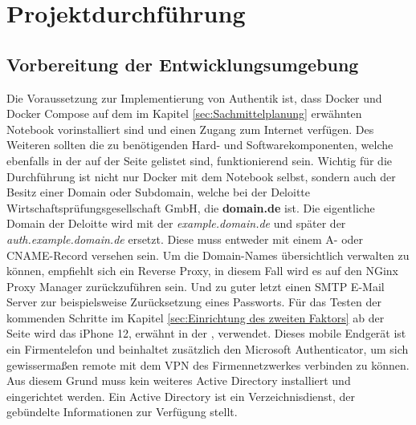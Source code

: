 \section{Projektdurchführung} 
\label{sec:Projektdurchführung}

\subsection{Vorbereitung der Entwicklungsumgebung}
\label{sec:Vorbereitung der Entwicklungsumgebung}
Die Voraussetzung zur Implementierung von Authentik ist, dass Docker und Docker Compose auf dem im Kapitel \ref{sec:Sachmittelplanung} 
 erwähnten Notebook vorinstalliert sind und einen Zugang zum Internet verfügen. Des Weiteren sollten die zu 
benötigenden Hard- und Softwarekomponenten, welche ebenfalls in der  auf der Seite \pageref{sec:Sachmittelplanung} 
gelistet sind, funktionierend sein. Wichtig für die Durchführung ist nicht nur Docker mit dem Notebook selbst, sondern auch der 
Besitz einer Domain oder Subdomain, welche bei der Deloitte Wirtschaftsprüfungsgesellschaft GmbH, die \textbf{domain.de} ist. 
Die eigentliche Domain der Deloitte wird mit der \textit{example.domain.de} und später der \textit{auth.example.domain.de} ersetzt.
Diese muss entweder mit einem A- oder CNAME-Record versehen sein. Um die Domain-Names übersichtlich verwalten zu können, 
empfiehlt sich ein Reverse Proxy, in diesem Fall wird es auf den NGinx Proxy Manager zurückzuführen sein. Und zu guter letzt einen SMTP 
E-Mail Server zur beispielsweise Zurücksetzung eines Passworts. Für das Testen der kommenden Schritte im Kapitel 
\ref{sec:Einrichtung des zweiten Faktors}  ab der Seite 
\pageref{sec:Einrichtung des zweiten Faktors} wird das iPhone 12, erwähnt in der , verwendet. 
Dieses mobile Endgerät ist ein Firmentelefon und beinhaltet zusätzlich den Microsoft Authenticator, um sich 
gewissermaßen remote mit dem VPN des Firmennetzwerkes verbinden zu können. Aus diesem Grund muss kein weiteres Active Directory 
installiert und eingerichtet werden. Ein Active Directory ist ein Verzeichnisdienst, der gebündelte Informationen zur Verfügung stellt.

